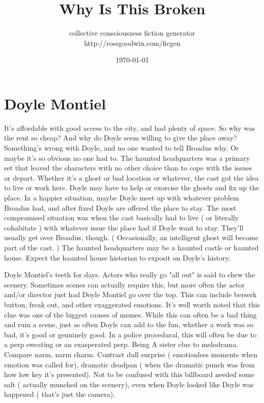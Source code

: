 \documentclass[12pt]{book}
\title{Why Is This Broken}
\author{collective consciousness fiction generator\\http://rossgoodwin.com/ficgen}
\date{\today}
\begin{document}
\maketitle



\chapter{Doyle Montiel}

It's affordable with good access to the city, and had plenty of space. So why was the rent so cheap? And why do Doyle seem willing to give the place away? Something's wrong with Doyle, and no one wanted to tell Broadus why. Or maybe it's so obvious no one had to. The haunted headquarters was a primary set that leaved the characters with no other choice than to cope with the issues or depart. Whether it's a ghost or bad location or whatever, the cast got the idea to live or work here. Doyle may have to help or exorcise the ghosts and fix up the place. In a happier situation, maybe Doyle meet up with whatever problem Broadus had, and after fixed Doyle are offered the place to stay. The most compromised situation was when the cast basically had to live ( or literally cohabitate ) with whatever issue the place had if Doyle want to stay. They'll usually get over Broadus, though. ( Occasionally, an intelligent ghost will become part of the cast. ) The haunted headquarters may be a haunted castle or haunted house. Expect the haunted house historian to exposit on Doyle's history.



Doyle Montiel's teeth for days. Actors who really go "all out" is said to chew the scenery. Sometimes scenes can actually require this, but more often the actor and/or director just had Doyle Montiel go over the top. This can include berserk button, freak out, and other exaggerated emotions. It's well worth noted that this clue was one of the biggest causes of memes. While this can often be a bad thing and ruin a scene, just as often Doyle can add to the fun, whether a work was so bad, it's good or genuinely good. In a police procedural, this will often be due to a perp sweating or an exasperated perp. Being A sister clue to melodrama. Compare narm, narm charm. Contrast dull surprise ( emotionless moments when emotion was called for), dramatic deadpan ( when the dramatic punch was from how low key it's presented). Not to be confused with this billboard needed some salt ( actually munched on the scenery), even when Doyle looked like Doyle was happened ( that's just the camera).
\end{document}
